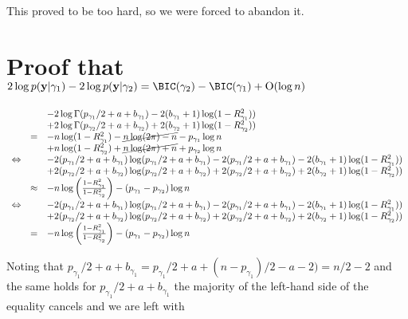 \documentclass{amsart}[12pt]
\theoremstyle{definition}
\begin{document}
This proved to be too hard, so we were forced to abandon it.

\section{Proof that $2 \log p(\vy | \gamma_1) - 2 \log p(\vy | \gamma_2) = \BIC(\gamma_2) - \BIC(\gamma_1) + \BigO(\log n)$}

$$
\begin{array}{rrl}
&&-2 \log\Gamma(p_{\gamma_1}/2 + a + b_{\gamma_1}) - 2(b_{\gamma_1} + 1) \log(1 - R^2_{\gamma_1})) \\
&&+2 \log\Gamma(p_{\gamma_2}/2 + a + b_{\gamma_2}) + 2(b_{\gamma_2} + 1) \log(1 - R^2_{\gamma_2})) \\
&=& -n \log(1 - R_{\gamma_1}^2) -\cancel{n \log(2 \pi) - n} - p_{\gamma_1} \log n \\
&&+n \log(1 - R_{\gamma_2}^2) +\cancel{n \log(2 \pi) + n} + p_{\gamma_2} \log n \\
\Leftrightarrow&&-2 (p_{\gamma_1}/2 + a + b_{\gamma_1})\log(p_{\gamma_1}/2 + a + b_{\gamma_1}) - 2(p_{\gamma_1}/2 + a + b_{\gamma_1}) - 2(b_{\gamma_1} + 1) \log(1 - R^2_{\gamma_1})) \\
&&+2 (p_{\gamma_2}/2 + a + b_{\gamma_2})\log(p_{\gamma_2}/2 + a + b_{\gamma_2}) + 2(p_{\gamma_2}/2 + a + b_{\gamma_2}) + 2(b_{\gamma_2} + 1) \log(1 - R^2_{\gamma_2})) \\
&\approx& -n \log \left(\frac{1 - R_{\gamma_1}^2}{1 - R_{\gamma_2}^2} \right) - (p_{\gamma_1} - p_{\gamma_2}) \log n \\
\Leftrightarrow&&-2 (p_{\gamma_1}/2 + a + b_{\gamma_1})\log(p_{\gamma_1}/2 + a + b_{\gamma_1}) - 2(p_{\gamma_1}/2 + a + b_{\gamma_1}) - 2(b_{\gamma_1} + 1) \log(1 - R^2_{\gamma_1})) \\
&&+2 (p_{\gamma_2}/2 + a + b_{\gamma_2})\log(p_{\gamma_2}/2 + a + b_{\gamma_2}) + 2(p_{\gamma_2}/2 + a + b_{\gamma_2}) + 2(b_{\gamma_2} + 1) \log(1 - R^2_{\gamma_2})) \\
&=& -n \log \left(\frac{1 - R_{\gamma_1}^2}{1 - R_{\gamma_2}^2} \right) - (p_{\gamma_1} - p_{\gamma_2}) \log n
\end{array}
$$

\noindent Noting that $p_{\gamma_1}/2 + a + b_{\gamma_1} = p_{\gamma_1}/2 + a + (n - p_{\gamma_1})/2 - a - 2)
= n/2 - 2$ and the same holds for $p_{\gamma_1}/2 + a + b_{\gamma_1}$ the majority of the left-hand side of
the equality cancels and we are left with
\end{document}
